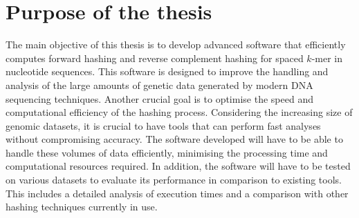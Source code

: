 \section{Purpose of the thesis}
\label{sec:thesis-purpose}

The main objective of this thesis is to develop advanced software that efficiently computes forward hashing and reverse complement hashing for spaced $k$-mer in nucleotide sequences. This software is designed to improve the handling and analysis of the large amounts of genetic data generated by modern \acs{DNA} sequencing techniques. Another crucial goal is to optimise the speed and computational efficiency of the hashing process. Considering the increasing size of genomic datasets, it is crucial to have tools that can perform fast analyses without compromising accuracy. The software developed will have to be able to handle these volumes of data efficiently, minimising the processing time and computational resources required. In addition, the software will have to be tested on various datasets to evaluate its performance in comparison to existing tools. This includes a detailed analysis of execution times and a comparison with other hashing techniques currently in use.